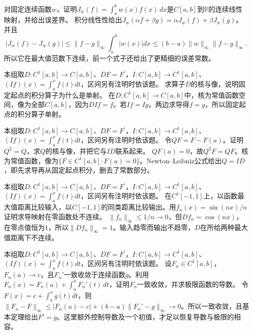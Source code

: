 对固定连续函数\(w\)，证明\(J_w(f)=\int_a^bw(x)f(x)\,dx\)是\(C[a,b]\)到\(\mathbb R\)的连续线性映射，并给出误差界。
\solutionanswer
积分线性性给出\(J_w(\alpha f+\beta g)=\alpha J_w(f)+\beta J_w(g)\)。并且
\[
 |J_w(f)-J_w(g)|\le\|f-g\|_\infty\int_a^b|w(x)|dx
 \le(b-a)\|w\|_\infty\|f-g\|_\infty.
\]
所以它在最大值范数下连续，前一个式子还给出了更精细的误差常数。


本组取\(D:C^1[a,b]\to C[a,b]\)、\(DF=F^{\prime}\)，\(I:C[a,b]\to C^1[a,b]\)、\((If)(x)=\int_a^xf(t)dt\)，区间另有注明时依该题。
求算子\(D\)的核与像，说明固定起点的积分算子为什么是单射。
\solutionanswer
在\(D:C^1[a,b]\to C[a,b]\)中，核为常值函数空间，像为全部\(C[a,b]\)，因为\(DIf=f\)。若\(If=Ig\)，两边求导得\(f=g\)，所以固定起点的积分算子单射。


本组取\(D:C^1[a,b]\to C[a,b]\)、\(DF=F^{\prime}\)，\(I:C[a,b]\to C^1[a,b]\)、\((If)(x)=\int_a^xf(t)dt\)，区间另有注明时依该题。
令\(QF=F-F(a)\)。证明\(Q^2=Q\)，求\(Q\)的核与像，并把它与\(ID\)联系起来。
\solutionanswer
\(QF(a)=0\)，故\(Q^2F=QF\)。核为常值函数，像为\(\{F\in C^1[a,b]:F(a)=0\}\)。Newton--Leibniz公式给出\(Q=ID\)，即先求导再从固定起点积分，删去了常数部分。


本组取\(D:C^1[a,b]\to C[a,b]\)、\(DF=F^{\prime}\)，\(I:C[a,b]\to C^1[a,b]\)、\((If)(x)=\int_a^xf(t)dt\)，区间另有注明时依该题。
在\(C^1[-1,1]\)上，以函数最大值距离比较输入，以\(C[-1,1]\)的同类距离比较输出。用\(f_n(x)=\sin(nx)/n\)证明求导映射在零函数处不连续。
\solutionanswer
\(\|f_n\|_\infty\le1/n\to0\)，但\(Df_n=\cos(nx)\)，在零点值恒为\(1\)，所以\(\|Df_n\|_\infty=1\)。输入趋零而输出不趋零，\(D\)在所给两种最大值距离下不连续。


本组取\(D:C^1[a,b]\to C[a,b]\)、\(DF=F^{\prime}\)，\(I:C[a,b]\to C^1[a,b]\)、\((If)(x)=\int_a^xf(t)dt\)，区间另有注明时依该题。
设\(F_n\in C^1[a,b]\)，\(F_n(a)\to c\)，且\(F_n'\)一致收敛于连续函数\(g\)。利用\(F_n(x)=F_n(a)+\int_a^xF_n'(t)\,dt\)，证明\(F_n\)一致收敛，并求极限函数的导数。
\solutionanswer
令\(F(x)=c+\int_a^xg(t)dt\)，则\(\|F_n-F\|_\infty\le|F_n(a)-c|+(b-a)\|F_n'-g\|_\infty\to0\)。所以一致收敛，且基本定理给出\(F'=g\)。这里额外控制导数及一个初值，才足以恢复导数与极限的相容。


